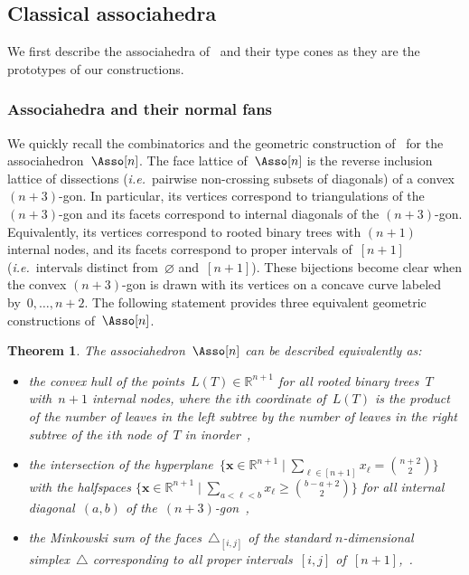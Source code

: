 \documentclass{amsart}
\newtheorem{theorem}{Theorem}[section]
\theoremstyle{definition}
\newcommand{\R}{\mathbb{R}} %
\renewcommand{\b}[1]{{\boldsymbol{#1}}} %
\newcommand{\bigset}[2]{\big\{ #1 \;\big|\; #2 \big\}} %
\newcommand{\simplex}{\triangle} %
\newcommand{\ie}{\textit{i.e.}~} %
\begin{document}

\subsection{Classical associahedra}

We first describe the associahedra of~\cite{ShniderSternberg, Loday} and their type cones as they are the prototypes of our constructions.

\subsubsection{Associahedra and their normal fans}

We quickly recall the combinatorics and the geometric construction of~\cite{ShniderSternberg, Loday} for the associahedron~$\Asso[n]$.
The face lattice of~$\Asso[n]$ is the reverse inclusion lattice of dissections (\ie pairwise non-crossing subsets of diagonals) of a convex~$(n+3)$-gon.
In particular, its vertices correspond to triangulations of the $(n+3)$-gon and its facets correspond to internal diagonals of the $(n+3)$-gon.
Equivalently, its vertices correspond to rooted binary trees with $(n+1)$ internal nodes, and its facets correspond to proper intervals of~$[n+1]$ (\ie intervals distinct from~$\varnothing$ and~$[n+1]$).
These bijections become clear when the convex $(n+3)$-gon is drawn with its vertices on a concave curve labeled by~$0, \dots, n+2$.
The following statement provides three equivalent geometric constructions of~$\Asso[n]$.

\begin{theorem}
\label{thm:associahedronLoday}
The associahedron~$\Asso[n]$ can be described equivalently as:
\begin{itemize}
\item the convex hull of the points~$L(T) \in \R^{n+1}$ for all rooted binary trees~$T$ with~$n+1$ internal nodes, where the $i$th coordinate of~$L(T)$ is the product of the number of leaves in the left subtree by the number of leaves in the right subtree of the $i$th node of~$T$ in inorder~\cite{Loday},
\item the intersection of the hyperplane~$\bigset{\b{x} \in \R^{n+1}}{\sum_{\ell \in [n+1]} x_\ell = \binom{n+2}{2}}$ with the halfspaces $\bigset{\b{x} \in \R^{n+1}}{\sum_{a < \ell < b} x_\ell \ge \binom{b-a+2}{2}}$ for all internal diagonal~$(a,b)$ of \mbox{the $(n+3)$-gon~\cite{ShniderSternberg}},
\item the Minkowski sum of the faces~$\simplex_{[i,j]}$ of the standard $n$-dimensional simplex~$\simplex$ corresponding to all proper intervals~$[i,j]$ of~$[n+1]$,~\cite{Postnikov}.
\end{itemize}
\end{theorem}
\end{document}

